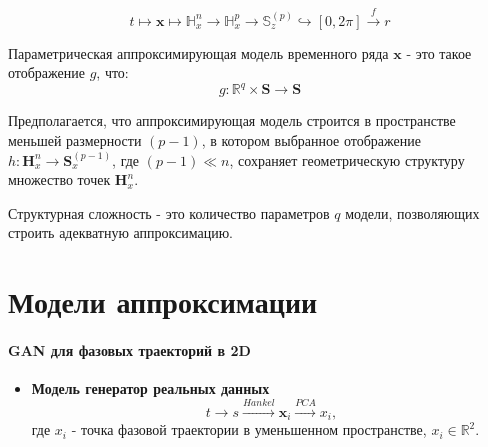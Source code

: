 \documentclass[12pt,twoside]{article}
\begin{document}
\begin{equation}
	t \mapsto \mathbf{x} \mapsto \mathbb{H}_{x}^{n} \xrightarrow{} \mathbb{H}_{x}^{p} \xrightarrow{} \mathbb{S}_z^{(p)} \hookrightarrow [0,2\pi] \xrightarrow{f} r
\label{eq:goal}
\end{equation}

\vspace{\baselineskip}

\begin{Def}
Параметрическая аппроксимирующая модель временного ряда  $\mathbf{x}$  - это такое отображение $g$, что:
\begin{equation}
	g: \mathbb{R}^{q} \times \mathbf{S} \xrightarrow{} \mathbf{S}
\label{eq:param_model}
\end{equation}
\end{Def}

Предполагается, что аппроксимирующая модель строится в пространстве меньшей размерности $(p-1)$, в котором выбранное отображение $h: \mathbf{H}_{x}^{n} \xrightarrow{} \mathbf{S}_x^{(p-1)} $, где $(p-1)\ll n$, сохраняет геометрическую структуру множество точек $\mathbf{H}_{x}^{n}$. 

\begin{Def}
Структурная сложность - это количество параметров $q$ модели, позволяющих строить адекватную аппроксимацию.
\end{Def}



\section{Модели аппроксимации}
\paragraph{GAN для фазовых траекторий в 2D}

\begin{itemize}
\item \textbf{Модель генератор реальных данных}
\begin{equation}
	t \xrightarrow{} s\xrightarrow{Hankel}  \mathbf{x}_i \xrightarrow{PCA} x_i,
	\label{eq:GAN_real}
\end{equation}
где $x_i$ - точка фазовой траектории в уменьшенном пространстве, $x_i \in \mathbb{R}^2$.
\end{itemize}
\end{document}
